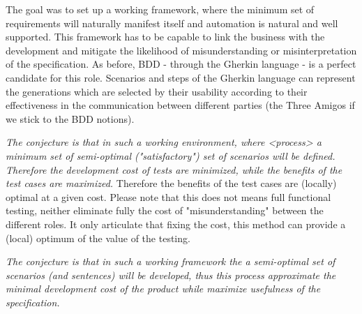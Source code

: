 \documentclass[conference]{IEEEtran}
\begin{document}
The goal was to set up a working framework, where the minimum set of requirements will naturally manifest itself and automation is natural and well supported. This framework has to be capable to link the business with the development and mitigate the likelihood of misunderstanding or misinterpretation of the specification. As before, BDD - through the Gherkin language - is a perfect candidate for this role. Scenarios and steps of the Gherkin language can represent the generations which are selected by their usability according to their effectiveness in the communication between different parties (the Three Amigos if we stick to the BDD notions).

\textit{The conjecture is that in such a working environment, where <process> a minimum set of semi-optimal ("satisfactory") set of scenarios will be defined. Therefore the development cost of tests are minimized, while the benefits of the test cases are maximized.} Therefore the benefits of the test cases are (locally) optimal at a given cost. Please note that this does not means full functional testing, neither eliminate fully the cost of "misunderstanding" between the different roles. It only articulate that fixing the cost, this method can provide a (local) optimum of the value of the testing. 

\textit{The conjecture is that in such a working framework the a semi-optimal set of scenarios (and sentences) will be developed, thus this process approximate the minimal development cost of the product while maximize usefulness of the specification.}

\end{document}
